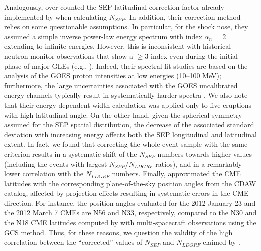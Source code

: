 \documentclass{aastex61}
\begin{document}
Analogously, \citet{ref:GOPALSWAMY2021} over-counted the SEP latitudinal correction factor already implemented by \citet{ref:DENOLFO2019} when calculating $N_{SEP}$. In addition, their correction method relies on some questionable assumptions. In particular, for the shock nose, they assumed a simple inverse power-law energy spectrum with 
index $\alpha_{n}$ = 2 extending to infinite energies. 
However, this is inconsistent with historical neutron monitor observations that show a $\ge$3 index even during the initial phase of major GLEs (e.g., \citealp{ref:VASHENYUK2011,ref:MISHEV2012,ref:KOLDOBSKIY2022,ref:MISHEV2023}). Indeed, their spectral fit studies are based on the analysis of the GOES proton intensities at low energies (10--100 MeV); furthermore, 
the large uncertainties associated with the GOES uncalibrated energy channels typically result in systematically harder spectra \citep{ref:BRUNO2017}. We also note that their energy-dependent width calculation was applied only to five eruptions with high latitudinal angle. On the other hand, given the spherical symmetry assumed for the SEP spatial distribution, the decrease of the associated standard deviation with increasing energy affects both the SEP longitudinal and latitudinal extent.
In fact, we found that correcting the whole event sample with the same criterion results in a systematic shift of the $N_{SEP}$ numbers towards higher values (including the events with largest $N_{SEP}$/$N_{LDGRF}$ ratios), and in a remarkably lower correlation with the $N_{LDGRF}$ numbers. 
Finally, \citet{ref:GOPALSWAMY2021} approximated the CME latitudes with the corresponding plane-of-the-sky position angles from the CDAW catalog, affected by projection effects resulting in systematic errors in the CME direction. For instance, the position angles evaluated for the 2012 January 23 and the 2012 March 7 CMEs are N56 and N33, respectively, compared to the N30 and the N18 CME latitudes computed by \citet{ref:GOPALSWAMY2014} with multi-spacecraft observations using the GCS method.
Thus, for these reasons, we question the validity of the high correlation between the ``corrected'' values of $N_{SEP}$ and $N_{LDGRF}$ claimed by \citet{ref:GOPALSWAMY2021}.



%
%
%
%
\end{document}
